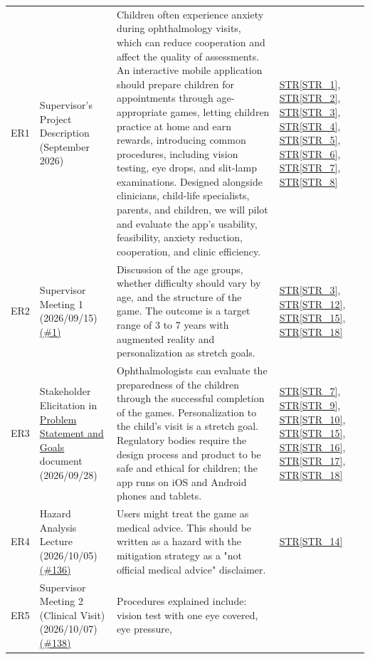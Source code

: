 \documentclass[10pt]{article}
\newcommand{\strref}[1]{\hyperref[#1]{STR\ref*{#1}}}
\begin{document}
\begin{longtable}{@{}p{} >{\raggedright\arraybackslash}p{} >{\raggedright\arraybackslash}p{} >{\raggedright\arraybackslash}p{}@{}}
ER1\label{ER1}
& Supervisor's Project Description (September 2026)
& Children often experience anxiety during ophthalmology visits, 
which can reduce cooperation and affect the quality of assessments. 
An interactive mobile application should prepare children for 
appointments through age-appropriate games, letting children practice 
at home and earn rewards, introducing common procedures, including 
vision testing, eye drops, and slit-lamp examinations. Designed alongside 
clinicians, child-life specialists, parents, and children, we will pilot 
and evaluate the app's usability, feasibility, anxiety reduction, 
cooperation, and clinic efficiency.
& \strref{STR_1}, \strref{STR_2}, \strref{STR_3},
\strref{STR_4}, \strref{STR_5}, \strref{STR_6},
\strref{STR_7}, \strref{STR_8} \\
ER2\label{ER2}
& Supervisor Meeting 1 (2026/09/15) \href{https://github.com/team-hindsight/ophthamology-game/issues/1}{(\#1)}
& Discussion of the age groups, whether
difficulty should vary by age, and the
structure of the game. The outcome is a target range of 
3 to 7 years with augmented 
reality and personalization as stretch goals.
& \strref{STR_3}, \strref{STR_12}, \strref{STR_15},
\strref{STR_18} \\
ER3\label{ER3}
& Stakeholder Elicitation in \href{https://team-hindsight.github.io/ophthamology-game/ProblemStatementAndGoals/ProblemStatement.pdf}{Problem Statement and Goals} document (2026/09/28)
& Ophthalmologists can evaluate the preparedness of the children through 
the successful completion of the games. Personalization to the child's visit 
is a stretch goal. Regulatory bodies require the design process and product 
to be safe and ethical for children; the app runs on iOS and Android phones 
and tablets.
& \strref{STR_7}, \strref{STR_9}, \strref{STR_10},
\strref{STR_15}, \strref{STR_16}, \strref{STR_17},
\strref{STR_18} \\
ER4\label{ER4}
& Hazard Analysis Lecture (2026/10/05) \href{https://github.com/team-hindsight/ophthamology-game/issues/136}{(\#136)}
& Users might treat the game as medical
advice. This should be written as a hazard with the mitigation strategy as a 
"not official medical advice" disclaimer.
& \strref{STR_14} \\
ER5\label{ER5}
& Supervisor Meeting 2 (Clinical Visit) (2026/10/07) \href{https://github.com/team-hindsight/ophthamology-game/issues/138}{(\#138)}
& Procedures explained include: vision test with one eye covered, eye pressure, 

\end{longtable}
\end{document}
